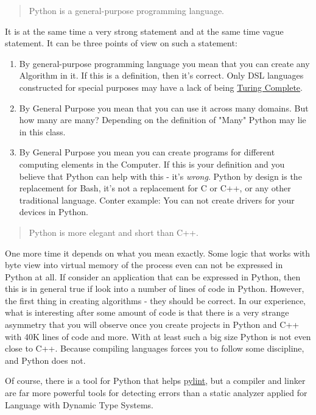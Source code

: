 \documentclass[
]{article}
\begin{document}
\begin{quote}
Python is a general-purpose programming language.
\end{quote}

It is at the same time a very strong statement and at the same time
vague statement. It can be three points of view on such a statement:

\begin{enumerate}
\def\labelenumi{\arabic{enumi}.}
\item
  By general-purpose programming language you mean that you can create
  any Algorithm in it. If this is a definition, then it's correct. Only
  DSL languages constructed for special purposes may have a lack of
  being \href{https://en.wikipedia.org/wiki/Turing_completeness}{Turing
  Complete}.
\item
  By General Purpose you mean that you can use it across many domains.
  But how many are many? Depending on the definition of "Many" Python
  may lie in this class.
\item
  By General Purpose you mean you can create programs for different
  computing elements in the Computer. If this is your definition and you
  believe that Python can help with this - it's \emph{wrong}. Python by
  design is the replacement for Bash, it's not a replacement for C or
  C++, or any other traditional language. Conter example: You can not
  create drivers for your devices in Python.
\end{enumerate}

\begin{quote}
Python is more elegant and short than C++.
\end{quote}

One more time it depends on what you mean exactly. Some logic that works
with byte view into virtual memory of the process even can not be
expressed in Python at all. If consider an application that can be
expressed in Python, then this is in general true if look into a number
of lines of code in Python. However, the first thing in creating
algorithms - they should be correct. In our experience, what is
interesting after some amount of code is that there is a very strange
asymmetry that you will observe once you create projects in Python and
C++ with 40K lines of code and more. With at least such a big size
Python is not even close to C++. Because compiling languages forces you
to follow some discipline, and Python does not.

Of course, there is a tool for Python that helps
\href{https://pypi.org/project/pylint/}{pylint}, but a compiler and
linker are far more powerful tools for detecting errors than a static
analyzer applied for Language with Dynamic Type Systems.
\end{document}
